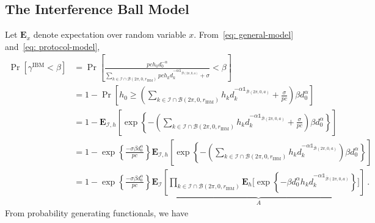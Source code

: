 \documentclass[12pt, draftclsnofoot, onecolumn]{IEEEtran}
\begin{document}
\subsection{The Interference Ball Model}
Let $\mathbf{E}_{x}$ denote expectation over random variable $x$. From~\eqref{eq: general-model} and~\eqref{eq: protocol-model},
\begin{align}\label{eq: IBM-1}
\Pr\left[\gamma^{\mathrm{IBM}} < \beta \right]  &= \Pr\left[\frac{p c h_0 d_{0}^{-\alpha}}{\sum\limits_{k \in \mathcal{I} \cap \mathcal{B}(2 \pi, 0, r_{\mathrm{IBM}})} p c h_k d_{k}^{-\alpha \mathds{1}_{\overline{\mathcal{B}}(2\pi,0,a)}} + \sigma}  < \beta \right] \nonumber \\
& = 1 - \Pr\left[h_0 \geq \left( \sum\limits_{k \in \mathcal{I} \cap \mathcal{B}(2 \pi, 0, r_{\mathrm{IBM}})} h_k d_{k}^{-\alpha \mathds{1}_{\overline{\mathcal{B}}(2\pi,0,a)}} + \frac{\sigma}{pc}\right)\beta d_{0}^{\alpha} \right]  \nonumber \\
& = 1 - \mathbf{E}_{\mathcal{I},h}\left[\exp\left\{ - \left( \sum\limits_{k \in \mathcal{I} \cap \mathcal{B}(2 \pi, 0, r_{\mathrm{IBM}})} h_k d_{k}^{-\alpha \mathds{1}_{\overline{\mathcal{B}}(2\pi,0,a)}} + \frac{\sigma}{pc}\right)\beta d_{0}^{\alpha} \right\} \right]  \nonumber \\
& = 1 - \exp\left\{ \frac{- \sigma \beta d_{0}^{\alpha}}{pc} \right\}\mathbf{E}_{\mathcal{I},h}\left[\exp\left\{ -\left( \sum\limits_{k \in \mathcal{I} \cap \mathcal{B}(2 \pi, 0, r_{\mathrm{IBM}})} h_k d_{k}^{-\alpha \mathds{1}_{\overline{\mathcal{B}}(2\pi,0,a)}} \right)\beta d_{0}^{\alpha} \right\} \right]\nonumber \\
& = 1 - \exp\left\{ \frac{- \sigma \beta d_{0}^{\alpha}}{pc} \right\}\underbrace{\mathbf{E}_{\mathcal{I}}\left[\prod\limits_{k \in \mathcal{I} \cap \mathcal{B}(2 \pi, 0, r_{\mathrm{IBM}})} \mathbf{E}_h \bigg[ \exp\left\{ - \beta d_{0}^{\alpha} h_k d_{k}^{-\alpha \mathds{1}_{\overline{\mathcal{B}}(2\pi,0,a)}} \right\} \bigg] \right] }_{A} \:.
\end{align}
From probability generating functionals, we have
\end{document}
